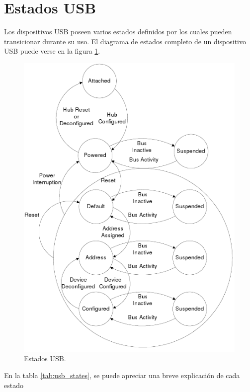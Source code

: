 \section{Estados USB}
Los dispositivos USB poseen varios estados definidos por los cuales pueden
transicionar durante su uso.
El diagrama de estados completo de un dispositivo USB puede verse en la figura
\ref{fig:usb_states}.


\begin{figure}
\centering
\includegraphics[scale=0.7]{./img/usb_states.png}
\caption{Estados USB.}
\label{fig:usb_states}
\end{figure}


En la tabla \ref{tab:usb_states}, se puede apreciar una breve explicaci\'on de
cada estado

